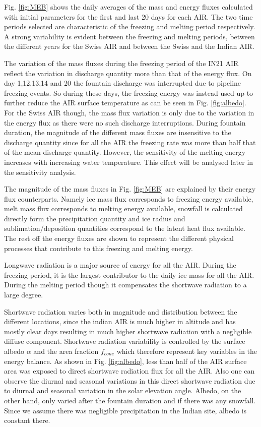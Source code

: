 \documentclass[utf8]{frontiersSCNS} %
\begin{document}
Fig. \ref{fig:MEB} shows the daily averages of the mass and energy fluxes calculated with initial parameters for the
first and last 20 days for each AIR. The two time periods selected are characteristic of the freezing and melting period
respectively. A strong variability is evident between the freezing and melting periods, between the different years for
the Swiss AIR and between the Swiss and the Indian AIR.

The variation of the mass fluxes during the freezing period of the IN21 AIR reflect the variation in discharge quantity
more than that of the energy flux. On day 1,12,13,14 and 20 the fountain discharge was interrupted due to pipeline
freezing events. So during these days, the freezing energy was instead used up to further reduce the AIR surface
temperature as can be seen in Fig. \ref{fig:albedo}. For the Swiss AIR though, the mass flux variation is only due to
the variation in the energy flux as there were no such discharge interruptions. During fountain duration, the magnitude
of the different mass fluxes are insensitive to the discharge quantity since for all the AIR the freezing rate was more
than half that of the mean discharge quantity. However, the sensitivity of the melting energy increases with increasing
water temperature. This effect will be analysed later in the sensitivity analysis.

The magnitude of the mass fluxes in Fig. \ref{fig:MEB} are explained by their energy flux counterparts. Namely ice mass
flux corresponds to freezing energy available, melt mass flux corresponds to melting energy available, snowfall is
calculated directly form the precipitation quantity and ice radius and sublimation/deposition quantities correspond to
the latent heat flux available. The rest off the energy fluxes are shown to represent the different physical processes
that contribute to this freezing and melting energy.

Longwave radiation is a major source of energy for all the AIR. During the freezing period, it is the largest
contributor to the daily ice mass for all the AIR. During the melting period though it compensates the shortwave
radiation to a large degree. 

Shortwave radiation varies both in magnitude and distribution between the different locations, since the indian AIR is
much higher in altitude and has mostly clear days resulting in much higher shortwave radiation with a negligible
diffuse component.  Shortwave radiation variability is controlled by the surface albedo $\alpha$ and the area
fraction $f_{cone}$ which therefore represent key variables in the energy balance. As shown in Fig. \ref{fig:albedo},
less than half of the AIR surface area was exposed to direct shortwave radiation flux for all the AIR. Also one can
observe the diurnal and seasonal variations in this direct shortwave radiation due to diurnal and seasonal variation in
the solar elevation angle.  Albedo, on the other hand, only varied after the fountain duration and if there was any
snowfall. Since we assume there was negligible precipitation in the Indian site, albedo is constant there. 
\end{document}
